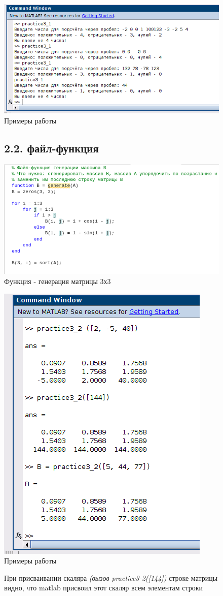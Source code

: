 \documentclass[12pt]{article}
\begin{document}
 \begin{figure}[!h]
	\centering
	\includegraphics[width=\linewidth]{procedure_run.png}
	\caption{Примеры работы}
\end{figure}
\begin{figure} 
 \subsection*{2.2. файл-функция}
\end{figure}
\begin{figure}[!h]
	\centering
	\includegraphics[width=\linewidth]{file_function.png}
	\caption{Функция - генерация матрицы 3х3}
\end{figure}

\begin{figure}[!h]
	\centering
	\includegraphics[width=0.6\linewidth]{function_run.png}
	\caption{Примеры работы}
\end{figure}

\begin{figure}
При присваивании скаляра \textit{(вызов practice3-2([144])} строке матрицы видно, что matlab присвоил этот скаляр всем элементам строки
\end{figure}
\end{document}

